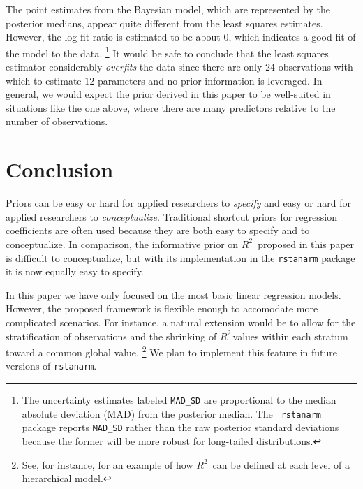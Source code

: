 \documentclass[11pt]{article}
\newcommand{\Rsq}{$R^2\,$}
\begin{document}
The point estimates from the Bayesian model, which are represented by the
posterior medians, appear quite different from the least squares estimates.
However, the log fit-ratio is estimated to be about $0$, which indicates a good
fit of the model to the data.%
\footnote{The uncertainty estimates labeled {\tt MAD\_SD} are proportional to
the median absolute deviation (MAD) from the posterior median. The {\tt
rstanarm} package reports {\tt MAD\_SD} rather than the raw posterior standard
deviations because the former will be more robust for long-tailed distributions.
}
It would be safe to conclude that the least squares estimator considerably
\emph{overfits} the data since there are only $24$ observations with which to
estimate $12$ parameters and no prior information is leveraged. In general, we
would expect the prior derived in this paper to be well-suited in situations
like the one above, where there are many predictors relative to the number of
observations.


\section{Conclusion}

Priors can be easy or hard for applied researchers to \emph{specify} and easy or
hard for applied researchers to \emph{conceptualize}. Traditional shortcut
priors for regression coefficients are often used because they are both easy to
specify and to conceptualize. In comparison, the informative prior on \Rsq
proposed in this paper is difficult to conceptualize, but with its
implementation in the {\tt rstanarm} package it is now equally easy to specify.

In this paper we have only focused on the most basic linear regression models.
However, the proposed framework is flexible enough to accomodate more
complicated scenarios. For instance, a natural extension would be to allow for
the stratification of observations and the shrinking of \Rsq values within each
stratum toward a common global value.%
\footnote{See, for instance,  for an example of how \Rsq
can be defined at each level of a hierarchical model.}
We plan to implement this feature in future versions of {\tt rstanarm}.


\nocite{Rcore}
\nocite{HSAUR3-package}



\end{document}

